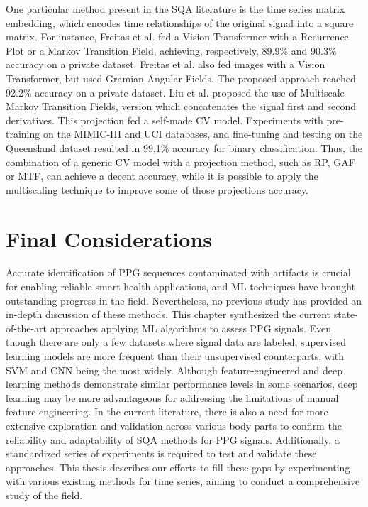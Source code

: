 

One particular method present in the \gls{SQA} literature is the time series matrix embedding, which encodes time relationships of the original signal into a square matrix. For instance, Freitas et al. \cite{imaging-4} fed a Vision Transformer with a Recurrence Plot or a Markov Transition Field, achieving, respectively, 89.9\% and 90.3\% accuracy on a private dataset. Freitas et al. \cite{imaging-5} also fed images with a Vision Transformer, but used Gramian Angular Fields. The proposed approach reached 92.2\% accuracy on a private dataset. Liu et al. \cite{imaging-6} proposed the use of Multiscale Markov Transition Fields, version which concatenates the signal first and second derivatives. This projection fed a self-made \gls{CV} model. Experiments with pre-training on the MIMIC-III and UCI databases, and fine-tuning and testing on the Queensland dataset resulted in 99,1\% accuracy for binary classification. Thus, the combination of a generic \gls{CV} model with a projection method, such as \gls{RP}, \gls{GAF} or \gls{MTF}, can achieve a decent accuracy, while it is possible to apply the multiscaling technique to improve some of those projections accuracy. 


\section{Final Considerations}
\label{sec:considerations}

Accurate identification of \gls{PPG} sequences contaminated with artifacts is crucial for enabling reliable smart health applications, and \gls{ML} techniques have brought outstanding progress in the field. Nevertheless, no previous study has provided an in-depth discussion of these methods. This chapter synthesized the current state-of-the-art approaches applying \gls{ML} algorithms to assess \gls{PPG} signals. Even though there are only a few datasets where signal data are labeled, supervised learning models are more frequent than their unsupervised counterparts, with \gls{SVM} and \gls{CNN} being the most
widely. Although feature-engineered and deep learning methods demonstrate similar performance levels in some scenarios, deep learning may be more advantageous for addressing the limitations of manual feature engineering. In the current literature, there is also a need for more extensive exploration and validation across various body parts to confirm the reliability and adaptability of \gls{SQA} methods for \gls{PPG} signals. Additionally, a standardized series of experiments is required to test and validate these approaches. This thesis describes our efforts to fill these gaps by experimenting with various existing methods for time series, aiming to conduct a comprehensive study of the field.
